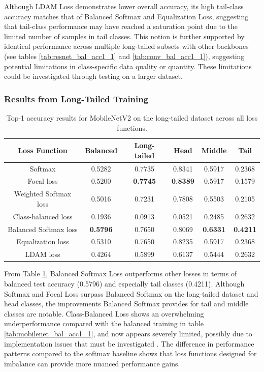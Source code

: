 Although LDAM Loss demonstrates lower overall accuracy, its high tail-class accuracy matches that of Balanced Softmax and Equalization Loss, suggesting that tail-class performance may have reached a saturation point due to the limited number of samples in tail classes. This notion is further supported by identical performance across multiple long-tailed subsets with other backbones (see tables \ref{tab:resnet_bal_acc1_1} and \ref{tab:conv_bal_acc1_1}), suggesting potential limitations in class-specific data quality or quantity. These limitations could be investigated through testing on a larger dataset. 

\subsubsection{Results from Long-Tailed Training}

\begin{table}[H]
    \centering
    \caption{Top-1 accuracy results for MobileNetV2 on the long-tailed dataset across all loss functions.}
    \begin{tabular}{cccccc}
        \toprule
        Loss Function & Balanced & Long-tailed & Head & Middle & Tail \\ 
        \midrule
        Softmax   & 0.5282   & 0.7735 & 0.8341 & 0.5917 & 0.2368 \\
        Focal loss   & 0.5200   & \textbf{0.7745} & \textbf{0.8389} & 0.5917 & 0.1579 \\
        Weighted Softmax loss   & 0.5016   & 0.7231 & 0.7808 & 0.5503 & 0.2105 \\
        Class-balanced loss   & 0.1936   & 0.0913 & 0.0521 & 0.2485 & 0.2632 \\
        Balanced Softmax loss   & \textbf{0.5796}   & 0.7650 & 0.8069 & \textbf{0.6331} & \textbf{0.4211} \\
        Equalization loss   & 0.5310   & 0.7650 & 0.8235 & 0.5917 & 0.2368 \\
        LDAM loss   & 0.4264 & 0.5899 & 0.6137 & 0.5444 & 0.2632 \\
        \bottomrule
    \end{tabular}
    \label{tab:mobilenet_lt_acc1_1}
\end{table}

From Table \ref{tab:mobilenet_lt_acc1_1}, Balanced Softmax Loss outperforms other losses in terms of balanced test accuracy (0.5796) and especially tail classes (0.4211). Although Softmax and Focal Loss surpass Balanced Softmax on the long-tailed dataset and head classes, the improvements Balanced Softmax provides for tail and middle classes are notable. Class-Balanced Loss shows an overwhelming underperformance compared with the balanced training in table \ref{tab:mobilenet_bal_acc1_1}, and now appears severely limited, possibly due to implementation issues that must be investigated . The difference in performance patterns compared to the softmax baseline shows that loss functions designed for imbalance can provide more nuanced performance gains.

